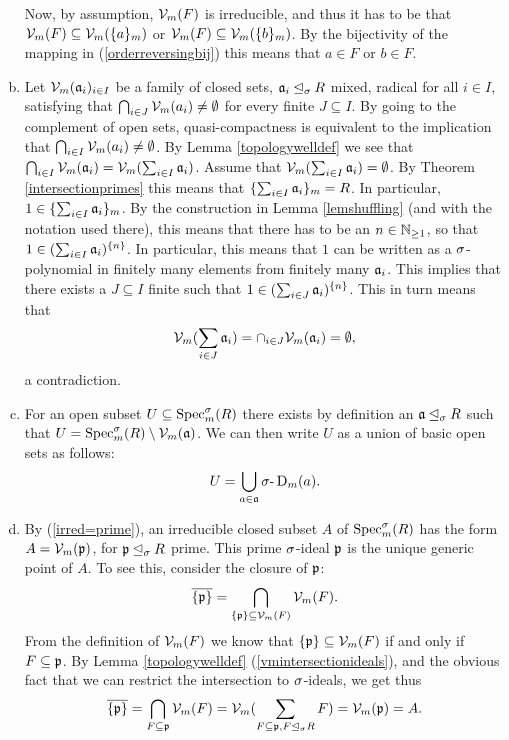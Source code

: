 \begin{prop}
\begin{bew}
\begin{enumerate}[(a)]
Now, by assumption, $\mathcal{V}_m(F)$ is irreducible, and thus it has to be that $\mathcal{V}_m(F) \subseteq \mathcal{V}_m(\{a\}_{m})$ or $\mathcal{V}_m(F) \subseteq \mathcal{V}_m(\{b\}_m)$. By the bijectivity of the mapping in (\ref{orderreversingbij}) this means that $a \in F$ or $b \in F$.
\item Let $\mathcal{V}_m(\mathfrak{a}_i)_{i \in I}$ be a family of closed sets, $\mathfrak{a}_i \unlhd_{\sigma} R$ mixed, radical for all $i \in I$, satisfying that 
$\bigcap_{i \in J} \mathcal{V}_m( a_i) \neq \emptyset$ for every finite $J \subseteq I$. By  going to the complement of open sets, quasi-compactness is equivalent to the implication that $\bigcap_{i \in I} \mathcal{V}_m(a_i) \neq \emptyset$.
By Lemma \ref{topologywelldef} we see that $\bigcap_{i \in I} \mathcal{V}_m( \mathfrak{a}_i) = \mathcal{V}_m ( \sum_{i \in I} \mathfrak{a}_i)$. Assume that $ \mathcal{V}_m ( \sum_{i \in I} \mathfrak{a}_i) = \emptyset$. 
By Theorem \ref{intersectionprimes} this means that $\{ \sum_{i \in I} \mathfrak{a}_i \}_m = R$. In particular, $1 \in \{ \sum_{i \in I} \mathfrak{a}_i \}_m$. By the construction in Lemma \ref{lemshuffling} (and with the notation used there), this means that there has to be an $n \in \mathbb{N}_{\geq1}$,
so that $1 \in (\sum_{i \in I} \mathfrak{a}_i )^{\{n\}}$. In particular, this means that $1$ can be written as a $\sigma$-polynomial in finitely many elements from finitely many $\mathfrak{a}_i$. This implies that there exists a $J \subseteq I$ finite such that
$1 \in (\sum_{i \in J} \mathfrak{a}_i)^{\{n\}}$. This in turn means that $$\mathcal{V}_m(\sum_{i \in J} \mathfrak{a}_i) = \cap_{i \in J} \mathcal{V}_m(\mathfrak{a}_i) = \emptyset,$$ a contradiction. 
\item For an open subset $U \subseteq \operatorname{Spec}^\sigma_m(R)$ there exists by definition an $\mathfrak{a} \unlhd_{\sigma} R$ such that $U = \operatorname{Spec}^\sigma_m(R) \setminus \mathcal{V}_m(\mathfrak{a})$. We can then write $U$ as a union of basic open sets as follows: $$U = \bigcup_{a \in \mathfrak{a}} \sigma\text{-}\operatorname{D}_m(a).$$
\item By (\ref{irred=prime}), an irreducible closed subset $A$ of $\operatorname{Spec}^\sigma_m(R)$ has the form $A = \mathcal{V}_m(\mathfrak{p})$, for $\mathfrak{p} \unlhd_{\sigma} R$ prime. This prime $\sigma$-ideal $\mathfrak{p}$ is the unique generic point of $A$.
To see this, consider the closure of $\mathfrak{p}$: $$\overline{\{\mathfrak{p}\}} = \bigcap_{\{\mathfrak{p}\} \subseteq \mathcal{V}_m(F)}\mathcal{V}_m(F).$$ From the definition of $\mathcal{V}_m(F)$ we know that $\{\mathfrak{p}\} \subseteq \mathcal{V}_m(F)$ if and only if $F \subseteq \mathfrak{p}$. By Lemma \ref{topologywelldef} (\ref{vmintersectionideals}), and the obvious fact that we can restrict the intersection to $\sigma$-ideals, we get thus
\[ \overline{\{\mathfrak{p}\}} = \bigcap_{F \subseteq \mathfrak{p}}\mathcal{V}_m(F) = \mathcal{V}_m(\sum_{F \subseteq \mathfrak{p}, F \unlhd_{\sigma} R} F) = \mathcal{V}_m(\mathfrak{p}) = A. \]
\end{enumerate}
\end{bew}
\end{prop}

\clearpage
